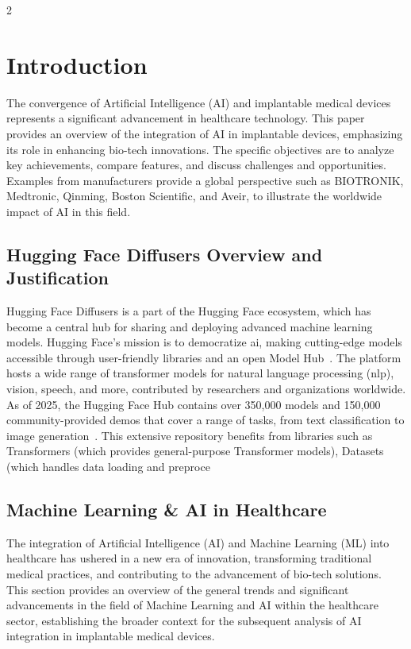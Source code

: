 \documentclass[12pt,oneside]{academia}
\theoremstyle{remark}
\begin{document}
\begin{multicols}{2}
\section{Introduction}\label{sec1}
The convergence of Artificial Intelligence (AI) and implantable medical devices represents a significant advancement in healthcare technology. This paper provides an overview of the integration of AI in implantable devices, emphasizing its role in enhancing bio-tech innovations. The specific objectives are to analyze key achievements, compare features, and discuss challenges and opportunities.  Examples from manufacturers provide a global perspective such as BIOTRONIK, Medtronic, Qinming, Boston Scientific, and Aveir, to illustrate the worldwide impact of AI in this field.

\subsection{Hugging Face Diffusers Overview and Justification}
Hugging Face Diffusers is a part of the Hugging Face ecosystem, which has become a central hub for sharing and deploying advanced machine learning models. Hugging Face's mission is to democratize \acrshort{ai}, making cutting-edge models accessible through user-friendly libraries and an open Model Hub~\cite{Sanh2019}. The platform hosts a wide range of transformer models for natural language processing (\acrshort{nlp}), vision, speech, and more, contributed by researchers and organizations worldwide. As of 2025, the Hugging Face Hub contains over 350,000 models and 150,000 community-provided demos that cover a range of tasks, from text classification to image generation~\cite{Sanh2019}. This extensive repository benefits from libraries such as Transformers (which provides general-purpose Transformer models), Datasets (which handles data loading and preproce

\subsection{Machine Learning \& AI in Healthcare} 
The integration of Artificial Intelligence (AI) and Machine Learning (ML) into healthcare has ushered in a new era of innovation, transforming traditional medical practices, and contributing to the advancement of bio-tech solutions. This section provides an overview of the general trends and significant advancements in the field of Machine Learning and AI within the healthcare sector, establishing the broader context for the subsequent analysis of AI integration in implantable medical devices.


\end{multicols}
\end{document}
